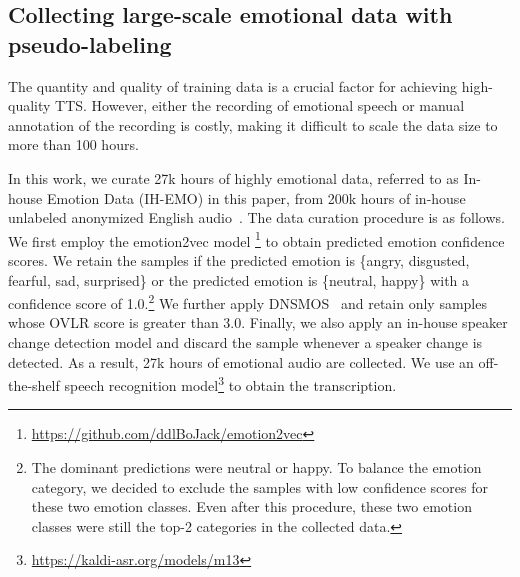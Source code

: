 \vspace{-.5em}
\subsection{Collecting large-scale emotional data with pseudo-labeling}
\label{ssec:data}
\vspace{-.5em}

The quantity and quality of training data is a crucial factor for achieving high-quality TTS. 
However, either the recording of emotional speech or manual annotation of the recording is costly, making it difficult to scale the data size to more than 100 hours.

In this work, we curate 27k hours of highly emotional data, referred to as In-house Emotion Data (IH-EMO) in this paper, from 200k hours of in-house unlabeled anonymized English audio~\cite{wang2024investigation}. The data curation procedure is as follows. We first employ the emotion2vec model \cite{ma2023emotion2vec}\footnote{\label{fn:emo2vec}\url{https://github.com/ddlBoJack/emotion2vec}} to obtain predicted emotion confidence scores. We retain the samples if the predicted emotion is \{angry, disgusted, fearful, sad, surprised\} or the predicted emotion is \{neutral, happy\} with a confidence score of 1.0.\footnote{The dominant predictions were neutral or happy. To balance the emotion category, we decided to exclude the samples with low confidence scores for these two emotion classes. Even after this procedure, these two emotion classes were still the top-2 categories in the collected data.} We further apply DNSMOS~\cite{reddy2022dnsmos} and retain only samples whose OVLR score is greater than 3.0. Finally, we also apply an in-house speaker change detection model and discard the sample whenever a speaker change is detected. As a result, 27k hours of emotional audio are collected.
We use an off-the-shelf speech recognition model\footnote{\label{fn:kaldi}\url{https://kaldi-asr.org/models/m13}} to obtain the transcription.

